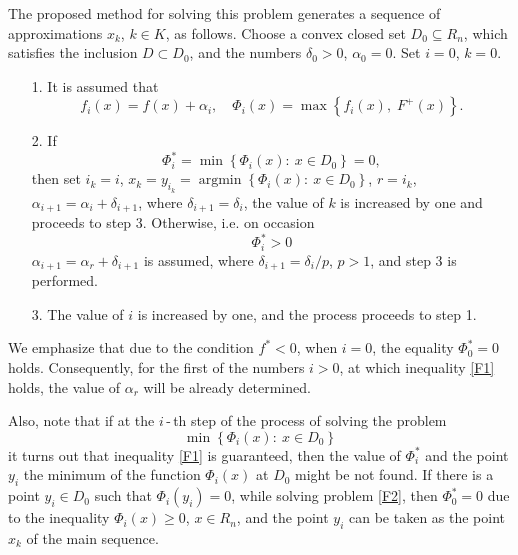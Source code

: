\documentclass[12pt]{llncs}
\begin{document}
The proposed method for solving this problem generates a sequence of approximations $x_k$, $k \in K$, as follows. Choose a convex closed set ${D_0} \subseteq {R_n}$, which satisfies the inclusion $D \subset {D_0}$, and the numbers ${\delta _0} > 0$, ${\alpha _0} = 0$. Set $i = 0$, $k = 0$.

\begin{itemize}
	\item [1.] It is assumed that
	$${f_i}\left( x \right) = f\left( x \right) + {\alpha _i},\quad {\Phi _i}\left( x \right) = \max \left\{ {{f_i}\left( x \right),\;{F^ + }\left( x \right)} \right\}.
	$$
	
	\item [2.] If
	$$\Phi _i^* = \min \left\{ {{\Phi _i}\left( x \right):\:x \in {D_0}} \right\} = 0,
	$$
	then set ${i_k} = i$, ${x_k} = {y_{{i_k}}} = \operatorname{argmin} \left\{ {{\Phi _i}\left( x \right):\:x \in {D_0}} \right\}$, $r = {i_k}$, ${\alpha _{i + 1}} = {\alpha _i} + {\delta _{i + 1}}$, where ${\delta _{i + 1}} = {\delta _i}$, the value of $k$ is increased by one and proceeds to step 3. Otherwise, i.e. on occasion
	\begin{equation}\label{F1}
		\Phi _i^* > 0
	\end{equation}
	${\alpha _{i + 1}} = {\alpha _r} + {\delta _{i + 1}}$ is assumed, where ${\delta _{i + 1}} = {\delta _i}/p$, $p > 1$, and step 3 is performed.
	
	\item [3.] The value of $i$ is increased by one, and the process proceeds to step 1.
\end{itemize} 

We emphasize that due to the condition ${f^*} < 0$, when $i = 0$, the equality $\Phi _0^* = 0$ holds. Consequently, for the first of the numbers $i > 0$, at which inequality \eqref{F1} holds, the value of ${\alpha _r}$ will be already determined.

Also, note that if at the $i$\,-\,th step of the process of solving the problem
\begin{equation}\label{F2}
	\min \left\{ {{\Phi _i}\left( x \right):\:x \in {D_0}} \right\}
\end{equation}
it turns out that inequality \eqref{F1} is guaranteed, then the value of $\Phi _i^*$ and the point $y_i$ the minimum of the function ${\Phi _i}\left( x \right)$ at $D_0$ might be not found. If there is a point ${y_i} \in {D_0}$ such that ${\Phi _i}\left( {{y_i}} \right) = 0$, while solving problem \eqref{F2}, then $\Phi _0^* = 0$ due to the inequality ${\Phi _i}\left( x \right) \geqslant 0$, $x \in {R_n}$, and the point $y_i$ can be taken as the point ${x_k}$ of the main sequence.
\end{document}
